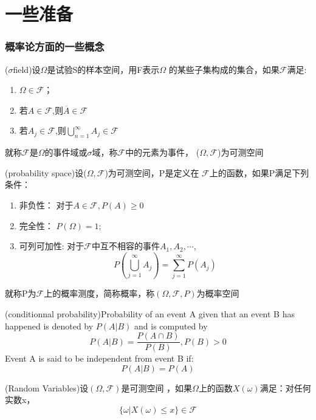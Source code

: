 \part{一些准备}
\pagestyle{empty}
\section{概率论方面的一些概念}
\begin{define}
($\sigma$field)设$\Omega$是试验S的样本空间，用F表示$\Omega$
的某些子集构成的集合，如果$\mathscr{F}$满足:
\begin{enumerate}
\item $\Omega \in \mathscr{F}$；
\item 若$A\in \mathscr{F}$,则$\overline{A}\in \mathscr{F}$
\item 若$A_j\in \mathscr{F}$,则$\displaystyle\bigcup _{n=1}^{\infty}A_j\in \mathscr{F}$
\end{enumerate}
就称$\mathscr{F}$是$\Omega$的事件域或$\sigma$域，称$\mathscr{F}$中的元素为事件，
($\Omega,\mathscr{F}$)为可测空间
\end{define}
\begin{define}
(probability space)设($\Omega,\mathscr{F}$)为可测空间，P是定义在
$\mathscr{F}$上的函数，如果P满足下列条件：
\begin{enumerate}
\item 非负性：
对于$A\in \mathscr{F},P(A)\geq 0$
\item 完全性：
$P(\Omega)=1$;

\item 可列可加性:
对于$\mathscr{F}$中互不相容的事件$A_1,A_2,\cdots$,
\[
P( \bigcup^{\infty}_{j=1}A_j)=\sum_{j=1}^{\infty}P(A_j)
\]

\end{enumerate}
就称P为$\mathscr{F}$上的概率测度，简称概率，称$(\Omega,\mathscr{F},P)$为概率空间
\end{define}
\begin{define}
(conditionnal probability)Probability of an event A given that an event B has happened
 is denoted by $ P(A|B)$ and is computed
by
\[
P(A|B)=\dfrac{P(A\cap B)}{P(B)},P(B)>0
\]
Event A is said to be independent from event B if:
\[
P(A|B)=P(A)
\]
\end{define}
\begin{define}
(Random Variables)设$(\Omega,\mathscr{F})$是可测空间
，如果$\Omega$上的函数$X(\omega)$满足：对任何实数x，
\[
\{\omega|X(\omega)\leqslant x\}\in \mathscr{F}
\]
\end{define}
